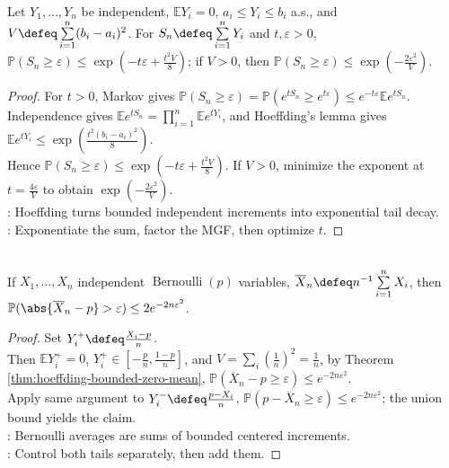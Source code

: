 \begin{theorem} \label{thm:hoeffding-bounded-zero-mean} \\
Let $Y_1,\ldots,Y_n$ be independent, $\mathbb{E}Y_i=0$, $a_i\leq Y_i\leq b_i$ a.s., and $V\defeq\sum\limits_{i=1}^{n}(b_i-a_i)^2$. For $S_n\defeq\sum\limits_{i=1}^{n}Y_i$ and $t,\varepsilon>0$, $\mathbb{P}(S_n\geq\varepsilon)\leq\exp(-t\varepsilon+\frac{t^2V}{8})$; if $V>0$, then $\mathbb{P}(S_n\geq\varepsilon)\leq\exp(-\frac{2\varepsilon^2}{V})$.
\begin{proof}
For $t>0$, Markov gives $\mathbb{P}(S_n\geq\varepsilon)=\mathbb{P}(e^{tS_n}\geq e^{t\varepsilon})\leq e^{-t\varepsilon}\mathbb{E}e^{tS_n}$.\\
Independence gives $\mathbb{E}e^{tS_n}=\prod\limits_{i=1}^{n}\mathbb{E}e^{tY_i}$, and Hoeffding's lemma gives $\mathbb{E}e^{tY_i}\leq\exp(\frac{t^2(b_i-a_i)^2}{8})$.\\
Hence $\mathbb{P}(S_n\geq\varepsilon)\leq\exp(-t\varepsilon+\frac{t^2V}{8})$. If $V>0$, minimize the exponent at $t=\frac{4\varepsilon}{V}$ to obtain $\exp(-\frac{2\varepsilon^2}{V})$.\\
: Hoeffding turns bounded independent increments into exponential tail decay.\\
: Exponentiate the sum, factor the MGF, then optimize $t$.
\end{proof}
\end{theorem}

\begin{corollary} \label{cor:hoeffding-bernoulli-average} \\
If $X_1,\ldots,X_n$ independent $\operatorname{Bernoulli}(p)$ variables, $\overline{X}_n\defeq n^{-1}\sum\limits_{i=1}^{n}X_i$, then $\mathbb{P}(\abs{\overline{X}_n-p}>\varepsilon)\leq2e^{-2n\varepsilon^2}$.
\begin{proof}
Set $Y_i^+\defeq\frac{X_i-p}{n}$.\\
Then $\mathbb{E}Y_i^+=0$, $Y_i^+\in[-\frac{p}{n},\frac{1-p}{n}]$, and $V=\sum\limits_i(\frac{1}{n})^2=\frac{1}{n}$, by Theorem \ref{thm:hoeffding-bounded-zero-mean}, $\mathbb{P}(\overline{X}_n-p\geq\varepsilon)\leq e^{-2n\varepsilon^2}$.\\
Apply same argument to $Y_i^-\defeq\frac{p-X_i}{n}$, $\mathbb{P}(p-\overline{X}_n\geq\varepsilon)\leq e^{-2n\varepsilon^2}$; the union bound yields the claim.\\
: Bernoulli averages are sums of bounded centered increments.\\
: Control both tails separately, then add them.
\end{proof}
\end{corollary}

